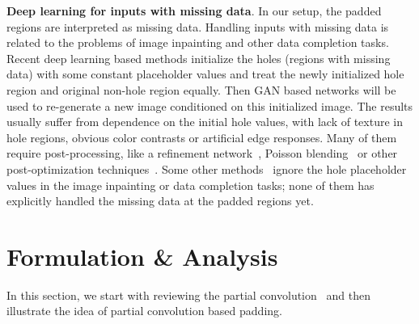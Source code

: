 \documentclass[10pt,twocolumn,letterpaper]{article}
\begin{document}
\textbf{Deep learning for inputs with missing data}. In our setup, the padded regions are interpreted as missing data. Handling inputs with missing data is related to the problems of image inpainting and other data completion tasks. Recent deep learning based methods \cite{pathak2016context,li2017generative,iizuka2017globally,yang2017high} initialize the holes (regions with missing data) with some constant placeholder values and treat the newly initialized hole region and original non-hole region equally. Then GAN based networks will be used to re-generate a new image conditioned on this initialized image. The results usually suffer from dependence on the initial hole values, with lack of texture in hole regions, obvious color contrasts or artificial edge responses. Many of them require post-processing, like a refinement network~\cite{yu2018generative,song2017image}, Poisson blending~\cite{iizuka2017globally} or other post-optimization techniques~\cite{yang2017high}. Some other methods~\cite{ulyanov2017deep,yeh2016semantic,uhrig2017sparsity} ignore the hole placeholder values in the image inpainting or data completion tasks; none of them has explicitly handled the missing data at the padded regions yet. 




\section{Formulation \& Analysis}

In this section, we start with reviewing the partial convolution~\cite{liu2018image} and then illustrate the idea of partial convolution based padding. 
\end{document}

